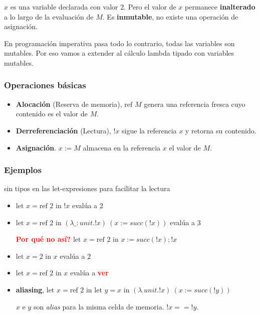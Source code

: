 \documentclass{report}
\theoremstyle{definition} %
\newcommand{\todo}[1]{{\textcolor{red}{\textbf{#1}}}}
\newcommand{\abs}[3]{\lambda #1 : #2 . #3}
\newcommand{\app}[2]{#1 \ #2} %
\newcommand{\suc}[1]{succ(#1)}
\newcommand{\num}[1]{\underbar{#1}} %
\newcommand{\seq}[2]{#1;#2}
\newcommand{\uletin}[3]{\text{let } #1 = #2 \text{ in } #3} %
\newcommand{\alloc}[1]{\text{ref } #1}
\newcommand{\dealloc}[1]{!#1}
\newcommand{\assign}[2]{#1 := #2}
\begin{document}
$x$ es una variable declarada con valor 2. Pero el valor de $x$ permanece
\textbf{inalterado} a lo largo de la evaluación de $M$. Es \textbf{inmutable},
no existe una operación de asignación.

En programación imperativa pasa todo lo contrario, todas las variables son
mutables. Por eso vamos a extender al cálculo lambda tipado con variables
mutables.

\subsubsection{Operaciones básicas}

\begin{itemize}
    \item \textbf{Alocación} (Reserva de memoria), $\alloc{M}$ genera una
    referencia fresca cuyo contenido es el valor de $M$.
    \item \textbf{Derreferenciación} (Lectura), $\dealloc{x}$ sigue la
    referencia $x$ y retorna su contenido.
    \item \textbf{Asignación}. $\assign{x}{M}$ almacena en la referencia $x$ el
    valor de $M$.
\end{itemize}

\subsubsection{Ejemplos}

sin tipos en las let-expresiones para facilitar la lectura

\begin{itemize}
    \item $\uletin{x}{\alloc{\num{2}}}{\dealloc{x}}$ evalúa a  $\num{2}$
    \item \(
        \uletin
            {x}
            {\alloc{\num{2}}}
            {\app
                {(\abs{\_}{unit}{\dealloc{x}})}
                {(\assign{x}{\suc{\dealloc{x}}})}
            }
    \) evalúa a $\num{3}$

    \todo{Por qué no así?} \( %
        \uletin
            {x}
            {\alloc{\num{2}}}
            {\seq
                {\assign{x}{\suc{\dealloc{x}}}}
                {\dealloc{x}}
            }
    \)
    
    \item $\uletin{x}{\num{2}}{x}$ evalúa a $\num{2}$
    \item $\uletin{x}{\alloc{\num{2}}}{x}$ evalúa a \todo{ver}
    \item \textbf{aliasing},  \(
        \uletin
            {x}
            {\alloc{\num{2}}}
            {
                \uletin{y}{x}
                {
                    \app
                        {(\abs{_}{unit}{\dealloc{x}})}
                        {(\assign{x}{\suc{\dealloc{y}}})}
                }
            }
    \)

    $x$ e $y$ son \textit{alias} para la misma celda de memoria. $\dealloc{x} == 
    \dealloc{y}$.
\end{itemize}
\end{document}
